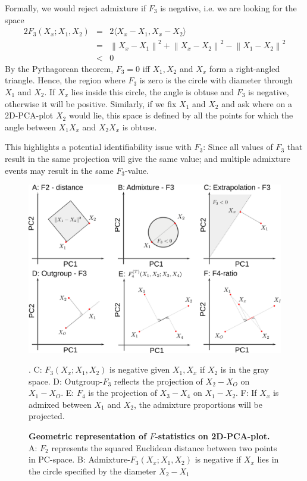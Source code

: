 \documentclass[10pt,a4paper]{article}
\newcommand{\normsq}[1]{\left\lVert#1\right\rVert^2}
\begin{document}
Formally, we would reject admixture if $F_3$ is negative, i.e. we are looking for the space
\begin{eqnarray}
2 F_3(X_x; X_1, X_2) &=& 2\langle  X_x - X_1, X_x - X_2 \rangle \nonumber\\
      &=& \normsq{X_x - X_1} + \normsq{X_x - X_2}  - \normsq{X_1 - X_2} \nonumber\\
      &<&0
\end{eqnarray}
By the Pythagorean theorem, $F_3 = 0 $ iff $X_1, X_2$ and $X_x$ form a right-angled triangle. Hence, the region where $F_3$ is zero is the circle with diameter through $X_1$ and $X_2$. If $X_x$ lies inside this circle, the angle is obtuse and $F_3$ is negative, otherwise it will be positive. Similarly, if we fix $X_1$ and $X_2$ and ask where on a 2D-PCA-plot $X_2$ would lie, this space is defined by all the points for which the angle between $X_1 X_x$ and $X_2 X_x$ is obtuse.

This highlights a potential identifiability issue with $F_3$: Since all values of $F_3$ that result in the same projection will give the same value; and multiple admixture events may result in the same $F_3$-value.

\begin{figure}[!ht]
	\includegraphics[width=\textwidth]{dummy_pca.png}
	\caption{\textbf{Geometric representation of $F$-statistics on 2D-PCA-plot.} A: $F_2$ represents the squared Euclidean distance between two points in PC-space. B: Admixture-$F_3(X_x; X_1, X_2)$ is negative if $X_x$ lies in the circle specified by the diameter $X_2-X_1$}. C: $F_3(X_x; X_1, X_2)$ is negative given $X_1, X_x$ if $X_2$ is in the gray space.  D: Outgroup-$F_3$ reflects the projection of $X_2 - X_O$ on $X_1 - X_O$. E: $F_4$ is the projection of $X_3 - X_4$ on $X_1-X_2$. F: If $X_x$ is admixed between $X_1$ and $X_2$, the admixture proportions will be projected.
\end{figure}
\end{document}
